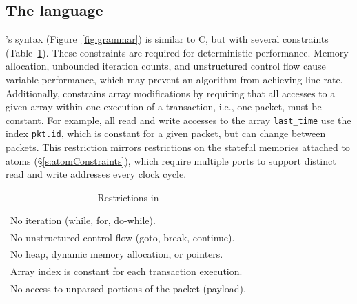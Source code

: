 
\subsection{The \pktlanguage language}
\label{ss:constraints}
\pktlanguage's syntax (Figure~\ref{fig:grammar}) is similar to C, but with
several constraints (Table~\ref{tab:restrict}).  These constraints are required
for deterministic performance.  Memory allocation, unbounded iteration counts,
and unstructured control flow cause variable performance, which may prevent an
algorithm from achieving line rate.  Additionally, \pktlanguage constrains
array modifications by requiring that all accesses to a given array within one
execution of a transaction, i.e., one packet, must be constant. 
For example, all read and write accesses to the array \texttt{last\_time} use
the index \texttt{pkt.id}, which is constant for a given packet, but can change
between packets. This restriction mirrors restrictions on the stateful memories
attached to atoms (\S\ref{s:atomConstraints}), which require multiple ports to
support distinct read and write addresses every clock cycle.

\begin{table}
  \begin{tabular}{p{}}
   No iteration (while, for, do-while).\\
   No unstructured control flow (goto, break, continue).\\
   No heap, dynamic memory allocation, or pointers.\\
   Array index is constant for each transaction execution.\\
   No access to unparsed portions of the packet (payload).\\
  \end{tabular}
  \caption{Restrictions in \pktlanguage}
  \label{tab:restrict}
\end{table}

